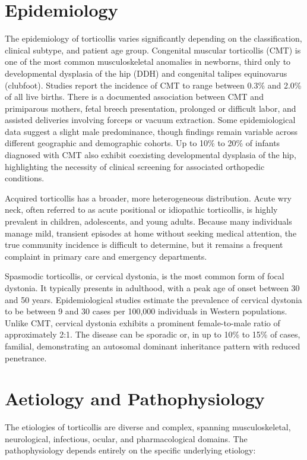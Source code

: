 \section*{Epidemiology}
The epidemiology of torticollis varies significantly depending on the classification, clinical subtype, and patient age group. Congenital muscular torticollis (CMT) is one of the most common musculoskeletal anomalies in newborns, third only to developmental dysplasia of the hip (DDH) and congenital talipes equinovarus (clubfoot). Studies report the incidence of CMT to range between 0.3\% and 2.0\% of all live births. There is a documented association between CMT and primiparous mothers, fetal breech presentation, prolonged or difficult labor, and assisted deliveries involving forceps or vacuum extraction. Some epidemiological data suggest a slight male predominance, though findings remain variable across different geographic and demographic cohorts. Up to 10\% to 20\% of infants diagnosed with CMT also exhibit coexisting developmental dysplasia of the hip, highlighting the necessity of clinical screening for associated orthopedic conditions.

Acquired torticollis has a broader, more heterogeneous distribution. Acute wry neck, often referred to as acute positional or idiopathic torticollis, is highly prevalent in children, adolescents, and young adults. Because many individuals manage mild, transient episodes at home without seeking medical attention, the true community incidence is difficult to determine, but it remains a frequent complaint in primary care and emergency departments.

Spasmodic torticollis, or cervical dystonia, is the most common form of focal dystonia. It typically presents in adulthood, with a peak age of onset between 30 and 50 years. Epidemiological studies estimate the prevalence of cervical dystonia to be between 9 and 30 cases per 100,000 individuals in Western populations. Unlike CMT, cervical dystonia exhibits a prominent female-to-male ratio of approximately 2:1. The disease can be sporadic or, in up to 10\% to 15\% of cases, familial, demonstrating an autosomal dominant inheritance pattern with reduced penetrance.

\section*{Aetiology and Pathophysiology}
The etiologies of torticollis are diverse and complex, spanning musculoskeletal, neurological, infectious, ocular, and pharmacological domains. The pathophysiology depends entirely on the specific underlying etiology:

